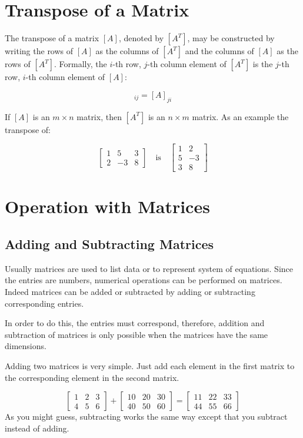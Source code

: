 \section{Transpose of a Matrix}
The transpose of a matrix $[A]$, denoted by $[A^T]$, may be constructed by writing the rows of $[A]$ as the columns of $[A^T]$
and the columns of $[A]$ as the rows of $[A^T]$.
Formally, the $i$-th row, $j$-th column element of $[A^T]$ is the $j$-th row, $i$-th column element of $[A]$:

\begin{equation}[A^T]_{ij} = [A]_{ji}\end{equation}

If $[A]$ is an $m\times n$ matrix, then $[A^T]$ is an $n\times m$ matrix. 
As an example the transpose of:

\begin{equation*}
\begin{bmatrix}
1 & 5 & 3 \\
2 & -3 & 8
\end{bmatrix}
\quad \mathrm{is} \quad
\begin{bmatrix}
1 & 2 \\
5 & -3 \\
3  & 8
\end{bmatrix}
\end{equation*}

\section{Operation with Matrices}
\subsection{Adding and Subtracting Matrices}\label{adding-and-subtracting-matrices}

Usually matrices are used to list data or to represent system of equations. Since the entries are numbers, numerical operations can be performed on matrices. Indeed matrices can be added or subtracted by adding or subtracting corresponding entries.

In order to do this, the entries must correspond, therefore, addition and subtraction of matrices is only possible when the matrices have the
same dimensions.

Adding two matrices is very simple. Just add each element in the first matrix to the corresponding element in the second matrix.

\begin{equation*}
\begin{bmatrix}
1 & 2 & 3 \\
4 & 5 & 6
\end{bmatrix}
+
\begin{bmatrix}
10 & 20 & 30\\
40 & 50 & 60
\end{bmatrix}
=
\begin{bmatrix}
11 & 22 & 33\\
44 & 55 & 66
\end{bmatrix}
\end{equation*}
As you might guess, subtracting works the same way except that you subtract instead of adding.

